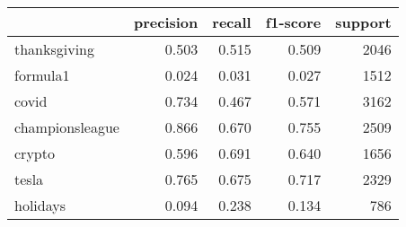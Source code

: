 \begin{tabular}{lrrrr}
\toprule
{} &  precision &  recall &  f1-score &  support \\
\midrule
thanksgiving    &      0.503 &   0.515 &     0.509 &     2046 \\
formula1        &      0.024 &   0.031 &     0.027 &     1512 \\
covid           &      0.734 &   0.467 &     0.571 &     3162 \\
championsleague &      0.866 &   0.670 &     0.755 &     2509 \\
crypto          &      0.596 &   0.691 &     0.640 &     1656 \\
tesla           &      0.765 &   0.675 &     0.717 &     2329 \\
holidays        &      0.094 &   0.238 &     0.134 &      786 \\
\bottomrule
\end{tabular}

